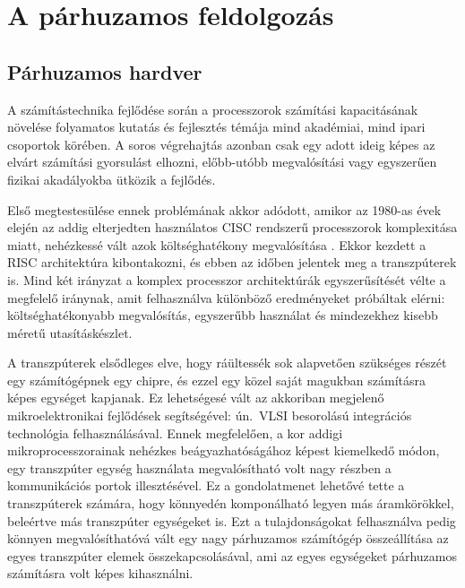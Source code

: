 \chapter{A párhuzamos feldolgozás}\label{ch:parallelism}


\section{Párhuzamos hardver}\label{sec:par-hw}

A számítástechnika fejlődése során a processzorok számítási kapacitásának növelése folyamatos kutatás és fejlesztés témája mind akadémiai, mind ipari csoportok körében.
A soros végrehajtás azonban csak egy adott ideig képes az elvárt számítási gyorsulást elhozni, előbb-utóbb megvalósítási vagy egyszerűen fizikai akadályokba ütközik a fejlődés.

Első megtestesülése ennek problémának akkor adódott, amikor az 1980-as évek elején az addig elterjedten használatos CISC rendszerű processzorok komplexitása miatt, nehézkessé vált azok költséghatékony megvalósítása \cite{patterson_case_1980}.
Ekkor kezdett a RISC architektúra kibontakozni, és ebben az időben jelentek meg a transzpúterek is.
Mind két irányzat a komplex processzor architektúrák egyszerűsítését vélte a megfelelő iránynak, amit felhasználva különböző eredményeket próbáltak elérni: költséghatékonyabb megvalósítás, egyszerűbb használat és mindezekhez kisebb méretű utasításkészlet.

A transzpúterek elsődleges elve, hogy ráültessék sok alapvetően szükséges részét egy számítógépnek egy chipre, és ezzel egy közel saját magukban számításra képes egységet kapjanak.
Ez lehetségesé vált az akkoriban megjelenő mikroelektronikai fejlődések segítségével: ún.\ VLSI besorolású integrációs technológia felhasználásával.
Ennek megfelelően, a kor addigi mikroprocesszorainak nehézkes beágyazhatóságához képest \cite{clark_microprocessor_1978} kiemelkedő módon, egy transzpúter egység használata megvalósítható volt nagy részben a kommunikációs portok illesztésével.
Ez a gondolatmenet lehetővé tette a transzpúterek számára, hogy könnyedén komponálható legyen más áramkörökkel, beleértve más transzpúter egységeket is.
Ezt a tulajdonságokat felhasználva pedig könnyen megvalósíthatóvá vált egy nagy párhuzamos számítógép összeállítása az egyes transzpúter elemek összekapcsolásával, ami az egyes egységeket párhuzamos számításra volt képes kihasználni.

